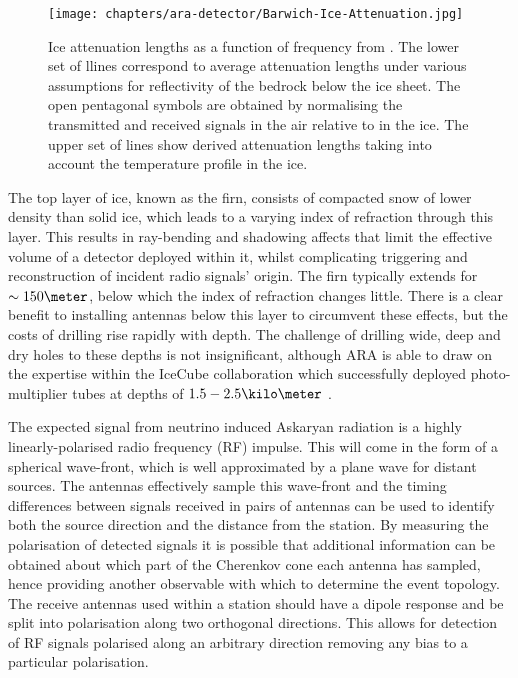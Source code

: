 \begin{figure}[htpb]
  \texttt{[image: chapters/ara-detector/Barwich-Ice-Attenuation.jpg]}
  \caption{Ice attenuation lengths as a function of frequency from \cite{Barwick:2005-03-01T00:00:00:0022-1430:231}. The lower set of llines correspond to average attenuation lengths under various assumptions for reflectivity of the bedrock below the ice sheet. The open pentagonal symbols are obtained by normalising the transmitted and received signals in the air relative to in the ice. The upper set of lines show derived attenuation lengths taking into account the temperature profile in the ice.}
  \label{fig:ara-detector:Ice-Attenuation}
\end{figure}

The top layer of ice, known as the firn, consists of compacted snow of lower density than solid ice, which leads to a varying index of refraction through this layer. This results in ray-bending and shadowing affects that limit the effective volume of a detector deployed within it, whilst complicating triggering and reconstruction of incident radio signals' origin. The firn typically extends for $\sim 150 \meter$, below which the index of refraction changes little. There is a clear benefit to installing antennas below this layer to circumvent these effects, but the costs of drilling rise rapidly with depth. The challenge of drilling wide, deep and dry holes to these depths is not insignificant, although ARA is able to draw on the expertise within the IceCube collaboration which successfully deployed photo-multiplier tubes at depths of $1.5 - 2.5 \kilo \meter$ \cite{2010RScI...81h1101H}.


The expected signal from neutrino induced Askaryan radiation is a highly linearly-polarised radio frequency (RF) impulse. This will come in the form of a spherical wave-front, which is well approximated by a plane wave for distant sources. The antennas effectively sample this wave-front and the timing differences between signals received in pairs of antennas can be used to identify both the source direction and the distance from the station. By measuring the polarisation of detected signals it is possible that additional information can be obtained about which part of the Cherenkov cone each antenna has sampled, hence providing another observable with which to determine the event topology. The receive antennas used within a station should have a dipole response and be split into polarisation along two orthogonal directions. This allows for detection of RF signals polarised along an arbitrary direction removing any bias to a particular polarisation.

